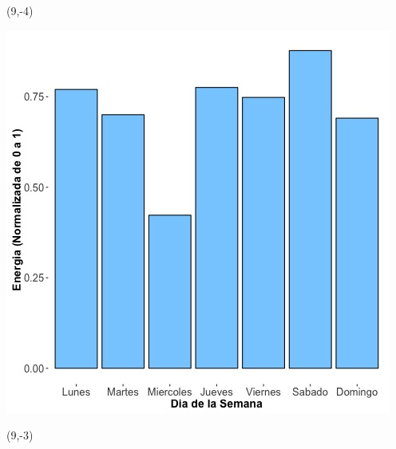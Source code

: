 \documentclass{article}\usepackage[]{graphicx}\usepackage[]{color}
\newenvironment{knitrout}{}{} %
\begin{document}
 \begin{textblock}{1}(9,-4)
\begin{minipage}{20em}
\begingroup

\endgroup
\end{minipage}
\end{textblock}


\begin{knitrout}
\color{fgcolor}
\includegraphics[scale=0.65]{figure/A16_day_of_week_plot} 
\end{knitrout}


 \begin{textblock}{1}(9,-3)
\begin{minipage}{20em}
\begingroup

\endgroup
\end{minipage}
\end{textblock}

 \vspace{2cm}
\end{document}
